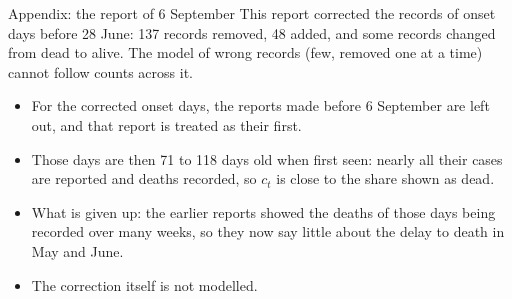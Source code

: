 \documentclass[aspectratio=169,9pt]{beamer}
\begin{document}
\begin{frame}{Appendix: the report of 6 September}
This report corrected the records of onset days before 28 June: 137 records
removed, 48 added, and some records changed from dead to alive. The model
of wrong records (few, removed one at a time) cannot follow counts across
it.

\bigskip
\begin{itemize}
\item For the corrected onset days, the reports made before 6 September are
left out, and that report is treated as their first.
\item Those days are then 71 to 118 days old when first seen: nearly all
their cases are reported and deaths recorded, so $c_t$ is close to the
share shown as dead.
\item What is given up: the earlier reports showed the deaths of those days
being recorded over many weeks, so they now say little about the delay to
death in May and June.
\item The correction itself is not modelled.
\end{itemize}
\end{frame}
\end{document}
